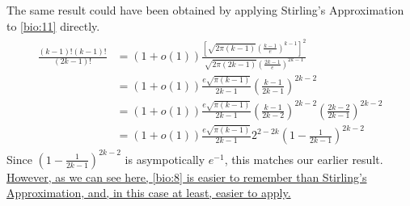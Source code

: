 \documentclass{article}
\begin{document}
The same result could have been obtained by applying Stirling's Approximation to  \cref{bio:11} directly.
\begin{align*}
\begin{aligned}
\frac{(k-1) !(k-1) !}{(2 k-1) !} &=(1+o(1)) \frac{\left[\sqrt{2 \pi(k-1)}\left(\frac{k-1}{e}\right)^{k-1}\right]^{2}}{\sqrt{2 \pi(2 k-1)}\left(\frac{2 k-1}{e}\right)^{2 k-1}} \\
&=(1+o(1)) \frac{e \sqrt{\pi(k-1)}}{2 k-1}\left(\frac{k-1}{2 k-1}\right)^{2 k-2} \\
&=(1+o(1)) \frac{e \sqrt{\pi(k-1)}}{2 k-1}\left(\frac{k-1}{2 k-2}\right)^{2 k-2}\left(\frac{2 k-2}{2 k-1}\right)^{2 k-2} \\
&=(1+o(1)) \frac{e \sqrt{\pi(k-1)}}{2 k-1} 2^{2-2 k}\left(1-\frac{1}{2 k-1}\right)^{2 k-2}
\end{aligned}
\end{align*}
Since $\left(1-\frac{1}{2 k-1}\right)^{2 k-2}$ is asympotically $e^{-1}$, this matches our earlier result. \uline{However, as we can see here,
\cref{bio:8} is easier to remember than Stirling's Approximation, and, in this case at least, easier to apply.}





\end{document}
